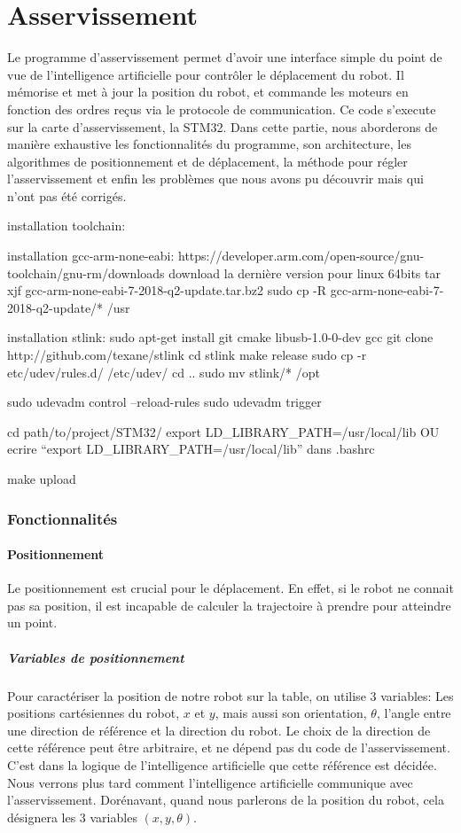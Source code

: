 \documentclass{article}
\begin{document}
	\part{Asservissement}
		Le programme d'asservissement permet d'avoir une interface simple du point de vue de l'intelligence artificielle pour contrôler le déplacement du robot. Il mémorise et met à jour la position du robot, et commande les moteurs en fonction des ordres reçus via le protocole de communication. Ce code s'execute sur la carte d'asservissement, la STM32. Dans cette partie, nous aborderons de manière exhaustive les fonctionnalités du programme, son architecture, les algorithmes de positionnement et de déplacement, la méthode pour régler l'asservissement et enfin les problèmes que nous avons pu découvrir mais qui n'ont pas été corrigés. 
		
		installation toolchain:

		installation gcc-arm-none-eabi:
		https://developer.arm.com/open-source/gnu-toolchain/gnu-rm/downloads
		download la dernière version pour linux 64bits
		tar xjf gcc-arm-none-eabi-7-2018-q2-update.tar.bz2
		sudo cp -R gcc-arm-none-eabi-7-2018-q2-update/* /usr

		installation stlink:
		sudo apt-get install git cmake libusb-1.0-0-dev gcc 
		git clone http://github.com/texane/stlink
		cd stlink
		make release
		sudo cp -r etc/udev/rules.d/ /etc/udev/
		cd ..
		sudo mv stlink/* /opt

		sudo udevadm control --reload-rules
		sudo udevadm trigger

		cd path/to/project/STM32/
		export LD_LIBRARY_PATH=/usr/local/lib
		OU
		ecrire ``export LD_LIBRARY_PATH=/usr/local/lib'' dans .bashrc

		make upload

		\section{Fonctionnalités}

			\subsection{Positionnement}
				Le positionnement est crucial pour le déplacement. En effet, si le robot ne connait pas sa position, il est incapable de calculer la trajectoire à prendre pour atteindre un point. 
				
				\subsubsection{Variables de positionnement}
					Pour caractériser la position de notre robot sur la table, on utilise 3 variables: Les positions cartésiennes du robot, $x$ et $y$, mais aussi son orientation, $\theta$, l'angle entre une direction de référence et la direction du robot. Le choix de la direction de cette référence peut être arbitraire, et ne dépend pas du code de l'asservissement. C'est dans la logique de l'intelligence artificielle que cette référence est décidée. Nous verrons plus tard comment l'intelligence artificielle communique avec l'asservissement. Dorénavant, quand nous parlerons de la position du robot, cela désignera les 3 variables $(x,y,\theta)$.
\end{document}
